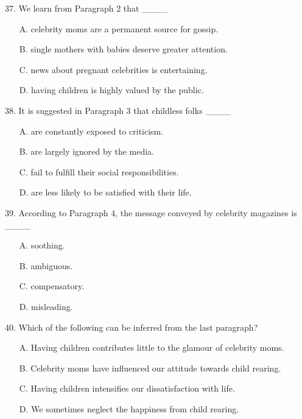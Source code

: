 \documentclass[UTF8,11pt]{ctexart}
\begin{document}
37. We learn from Paragraph 2 that \_\_\_\_


\begin{itemize}[leftmargin=2em,itemsep=.2em,topsep=.4em]\item[A.] celebrity moms are a permanent source for gossip.
\item[B.] single mothers with babies deserve greater attention.
\item[C.] news about pregnant celebrities is entertaining.
\item[D.] having children is highly valued by the public.
\end{itemize}

38. It is suggested in Paragraph 3 that childless folks \_\_\_\_


\begin{itemize}[leftmargin=2em,itemsep=.2em,topsep=.4em]\item[A.] are constantly exposed to criticism.
\item[B.] are largely ignored by the media.
\item[C.] fail to fulfill their social responsibilities.
\item[D.] are less likely to be satisfied with their life.
\end{itemize}

39. According to Paragraph 4, the message conveyed by celebrity magazines is \_\_\_\_


\begin{itemize}[leftmargin=2em,itemsep=.2em,topsep=.4em]\item[A.] soothing.
\item[B.] ambiguous.
\item[C.] compensatory.
\item[D.] misleading.
\end{itemize}

40. Which of the following can be inferred from the last paragraph?


\begin{itemize}[leftmargin=2em,itemsep=.2em,topsep=.4em]\item[A.] Having children contributes little to the glamour of celebrity moms.
\item[B.] Celebrity moms have influenced our attitude towards child rearing.
\item[C.] Having children intensifies our dissatisfaction with life.
\item[D.] We sometimes neglect the happiness from child rearing.
\end{itemize}
\end{document}
